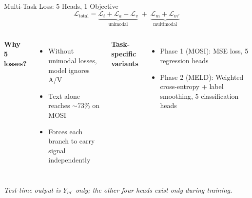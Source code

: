 \documentclass[aspectratio=169,10pt]{beamer}
\begin{document}
\begin{frame}{Multi-Task Loss: 5 Heads, 1 Objective}
  \begin{equation*}
    \mathcal{L}_{\text{total}} = \underbrace{\mathcal{L}_t + \mathcal{L}_a + \mathcal{L}_v}_{\text{unimodal}}
    \;+\; \underbrace{\mathcal{L}_m + \mathcal{L}_{m'}}_{\text{multimodal}}
  \end{equation*}
  \vspace{0.3em}
  \begin{columns}[t]
    \textbf{Why 5 losses?}
    \begin{itemize}
      \item Without unimodal losses, model ignores A/V
      \item Text alone reaches $\sim$73\% on MOSI
      \item Forces each branch to carry signal independently
    \end{itemize}

    \textbf{Task-specific variants}
    \begin{itemize}
      \item Phase 1 (MOSI): MSE loss, 5 regression heads
      \item Phase 2 (MELD): Weighted cross-entropy + label smoothing, 5 classification heads
    \end{itemize}
  \end{columns}
  \vspace{0.7em}
  \centering
  \footnotesize\emph{Test-time output is $Y_{m'}$ only; the other four heads exist only during training.}
\end{frame}
\end{document}
